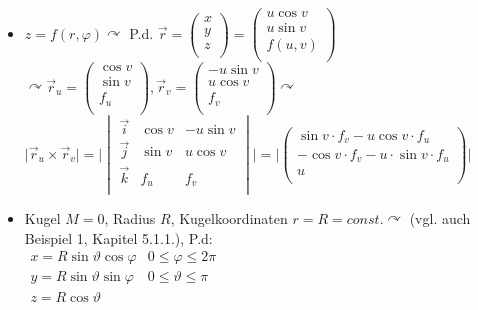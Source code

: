 \documentclass[a4paper]{scrartcl}
\begin{document}
\begin{itemize}
\item $z=f(r,\varphi) \curvearrowright$ P.d. $\vec{r} = \begin{pmatrix} x\\y\\z\\ \end{pmatrix} = \begin{pmatrix} u \cos{v}\\ u \sin{v} \\ f(u,v) \\ \end{pmatrix}$\\
$\curvearrowright \vec{r}_u = \begin{pmatrix} \cos{v} \\ \sin{v} \\ f_u \\ \end{pmatrix} , \vec{r}_v = \begin{pmatrix} - u \sin{v} \\ u \cos{v} \\ f_v \\ \end{pmatrix} \curvearrowright$\\
$\lvert \vec{r}_u \times \vec{r}_v \rvert = \lvert \begin{vmatrix} \vec{i} & \cos{v} &-u \sin{v} \\ \vec{j}& \sin{v}& u \cos{v}\\ \vec{k} &f_u& f_v \\ \end{vmatrix} \rvert = \lvert \begin{pmatrix} \sin{v} \cdot f_v - u \cos{v} \cdot f_u \\ - \cos{v} \cdot f_v - u \cdot \sin{v} \cdot f_u \\ u \\ \end{pmatrix} \rvert $
\item Kugel $M=0$, Radius $R$, Kugelkoordinaten $r=R=const. \curvearrowright$
(vgl. auch Beispiel 1, Kapitel 5.1.1.), P.d: \\
$\begin{array}{c|c}
x= R \sin{\vartheta} \cos{\varphi} & 0 \leq \varphi \leq 2 \pi\\
y= R \sin{\vartheta} \sin{\varphi} & 0 \leq \vartheta \leq \pi \\
z = R \cos{\vartheta} & \\ \end{array}$\\

\end{itemize}
\end{document}
